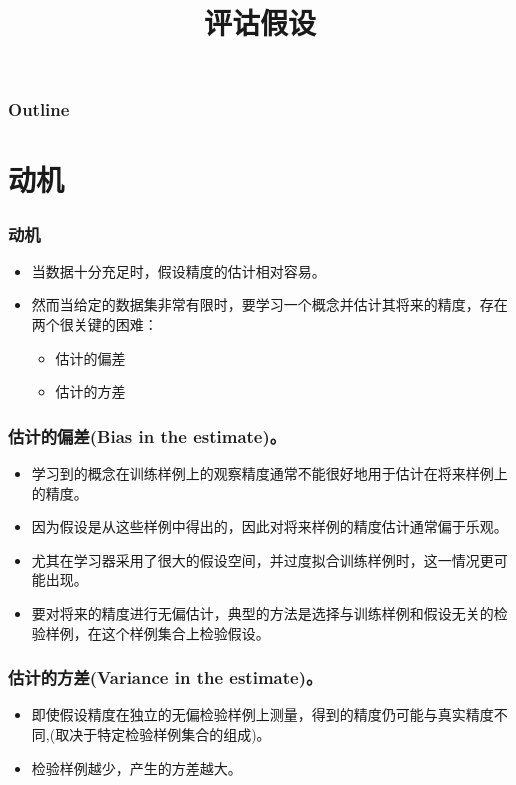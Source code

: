\documentclass{beamer}
\title{评诂假设}
\author{}
\date{}
\begin{document}
\maketitle

\begin{frame}
\frametitle{Outline}
\setcounter{tocdepth}{3}
\tableofcontents
\end{frame}










\section{动机}
\label{sec-1}
\begin{frame}
\frametitle{动机}
\label{sec-1-1}

\begin{itemize}
\item 当数据十分充足时，假设精度的估计相对容易。
\item 然而当给定的数据集非常有限时，要学习一个概念并估计其将来的精度，存在两个很关键的困难：
\begin{itemize}
\item 估计的偏差
\item 估计的方差
\end{itemize}
\end{itemize}
\end{frame}
\begin{frame}
\frametitle{估计的偏差(Bias in the estimate)。}
\label{sec-1-2}

\begin{itemize}
\item 学习到的概念在训练样例上的观察精度通常不能很好地用于估计在将来样例上的精度。
\item 因为假设是从这些样例中得出的，因此对将来样例的精度估计通常偏于乐观。
\item 尤其在学习器采用了很大的假设空间，并过度拟合训练样例时，这一情况更可能出现。
\item 要对将来的精度进行无偏估计，典型的方法是选择与训练样例和假设无关的检验样例，在这个样例集合上检验假设。
\end{itemize}
\end{frame}
\begin{frame}
\frametitle{估计的方差(Variance in the estimate)。}
\label{sec-1-3}

\begin{itemize}
\item 即使假设精度在独立的无偏检验样例上测量，得到的精度仍可能与真实精度不同,(取决于特定检验样例集合的组成)。
\item 检验样例越少，产生的方差越大。
\end{itemize}
\end{frame}
\end{document}
